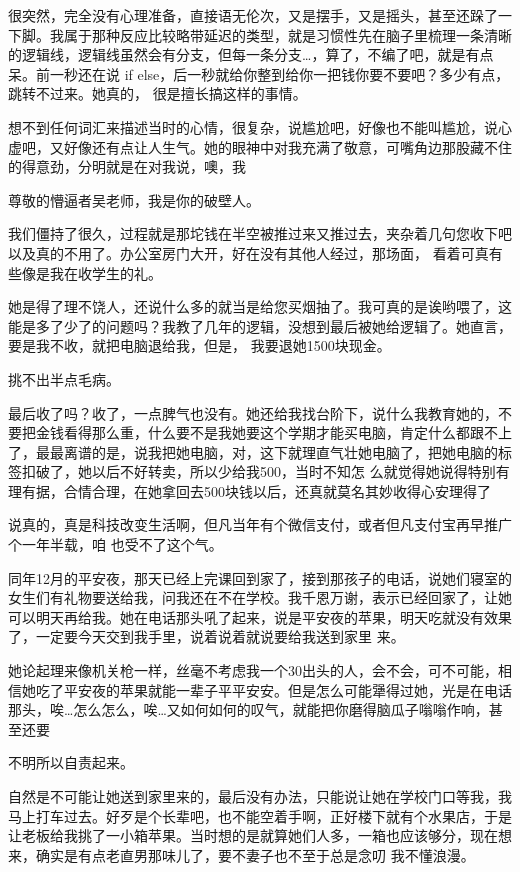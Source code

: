 \documentclass{article}
\begin{document}
很突然，完全没有心理准备，直接语无伦次，又是摆手，又是摇头，甚至还跺了一下脚。我属于那种反应比较略带延迟的类型，就是习惯性先在脑子里梳理一条清晰的逻辑线，逻辑线虽然会有分支，但每一条分支…，算了，不编了吧，就是有点呆。前一秒还在说 if else，后一秒就给你整到给你一把钱你要不要吧？多少有点，跳转不过来。她真的，
很是擅长搞这样的事情。 

想不到任何词汇来描述当时的心情，很复杂，说尴尬吧，好像也不能叫尴尬，说心虚吧，又好像还有点让人生气。她的眼神中对我充满了敬意，可嘴角边那股藏不住的得意劲，分明就是在对我说，噢，我
\newpage

尊敬的懵逼者吴老师，我是你的破壁人。 

我们僵持了很久，过程就是那坨钱在半空被推过来又推过去，夹杂着几句您收下吧以及真的不用了。办公室房门大开，好在没有其他人经过，那场面，
看着可真有些像是我在收学生的礼。 

她是得了理不饶人，还说什么多的就当是给您买烟抽了。我可真的是诶哟喂了，这能是多了少了的问题吗？我教了几年的逻辑，没想到最后被她给逻辑了。她直言，要是我不收，就把电脑退给我，但是，
我要退她1500块现金。 


挑不出半点毛病。 

最后收了吗？收了，一点脾气也没有。她还给我找台阶下，说什么我教育她的，不要把金钱看得那么重，什么要不是我她要这个学期才能买电脑，肯定什么都跟不上了，最最离谱的是，说我把她电脑，对，这下就理直气壮她电脑了，把她电脑的标签扣破了，她以后不好转卖，所以少给我500，当时不知怎
\newpage
么就觉得她说得特别有理有据，合情合理，在她拿回去500块钱以后，还真就莫名其妙收得心安理得了

说真的，真是科技改变生活啊，但凡当年有个微信支付，或者但凡支付宝再早推广个一年半载，咱
也受不了这个气。 


同年12月的平安夜，那天已经上完课回到家了，接到那孩子的电话，说她们寝室的女生们有礼物要送给我，问我还在不在学校。我千恩万谢，表示已经回家了，让她可以明天再给我。她在电话那头吼了起来，说是平安夜的苹果，明天吃就没有效果了，一定要今天交到我手里，说着说着就说要给我送到家里
来。 

她论起理来像机关枪一样，丝毫不考虑我一个30出头的人，会不会，可不可能，相信她吃了平安夜的苹果就能一辈子平平安安。但是怎么可能犟得过她，光是在电话那头，唉…怎么怎么，唉…又如何如何的叹气，就能把你磨得脑瓜子嗡嗡作响，甚至还要
\newpage

不明所以自责起来。 

自然是不可能让她送到家里来的，最后没有办法，只能说让她在学校门口等我，我马上打车过去。好歹是个长辈吧，也不能空着手啊，正好楼下就有个水果店，于是让老板给我挑了一小箱苹果。当时想的是就算她们人多，一箱也应该够分，现在想来，确实是有点老直男那味儿了，要不妻子也不至于总是念叨
我不懂浪漫。 
\end{document}
